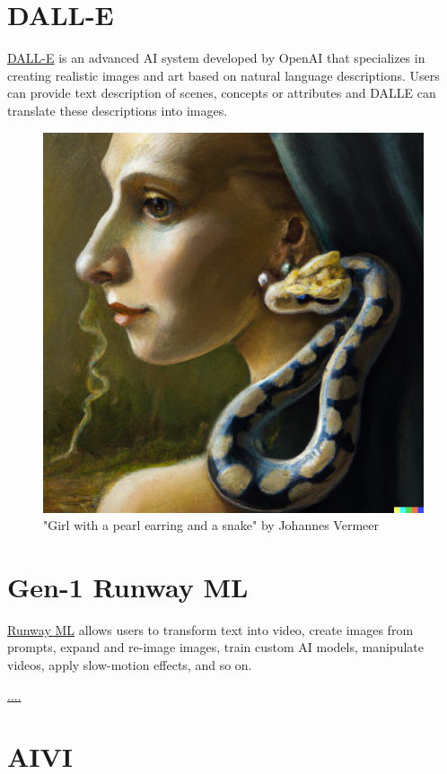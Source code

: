 \documentclass[
]{book}
\begin{document}
\hypertarget{dall-e}{%
\section{DALL-E}\label{dall-e}}

\href{https://labs.openai.com/}{DALL-E} is an advanced AI system developed by OpenAI that specializes in creating realistic images and art based on natural language descriptions. Users can provide text description of scenes, concepts or attributes and DALLE can translate these descriptions into images.

\begin{figure}

{\centering \includegraphics[width=0.7\linewidth]{Girl_with_a_pearlearrring_a_snake} 

}

\caption{"Girl with a pearl earring and a snake" by Johannes Vermeer}\label{fig:unnamed-chunk-12}
\end{figure}

\hypertarget{gen-1-runway-ml}{%
\section{Gen-1 Runway ML}\label{gen-1-runway-ml}}

\href{https://runwayml.com/}{Runway ML} allows users to transform text into video, create images from prompts, expand and re-image images, train custom AI models, manipulate videos, apply slow-motion effects, and so on.

\url{....}

\hypertarget{aivi}{%
\section{AIVI}\label{aivi}}
\end{document}
